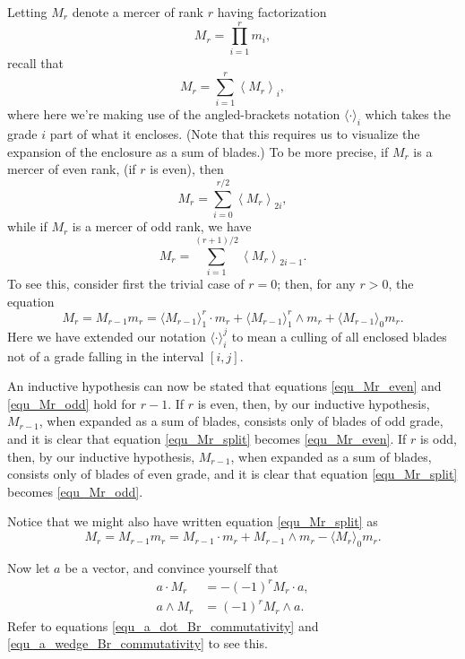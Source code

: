 \documentclass{birkjour}
\theoremstyle{definition}
\theoremstyle{remark}
\numberwithin{equation}{section}
\begin{document}
Letting $M_r$ denote a mercer of rank $r$ having factorization
\begin{equation}\label{equ_M_r}
M_r = \prod_{i=1}^r m_i,
\end{equation}
recall that
\begin{equation*}
M_r = \sum_{i=1}^r\left\langle M_r\right\rangle_i,
\end{equation*}
where here we're making use of the angled-brackets notation $\langle\cdot\rangle_i$ which takes the grade $i$ part of
what it encloses.  (Note that this requires us to visualize the expansion of the enclosure as a sum of blades.)  To be more precise,
if $M_r$ is a mercer of even rank, (if $r$ is even), then
\begin{equation}\label{equ_Mr_even}
M_r = \sum_{i=0}^{r/2}\left\langle M_r\right\rangle_{2i},
\end{equation}
while if $M_r$ is a mercer of odd rank, we have
\begin{equation}\label{equ_Mr_odd}
M_r = \sum_{i=1}^{(r+1)/2}\left\langle M_r\right\rangle_{2i-1}.
\end{equation}
To see this, consider first the trivial case of $r=0$; then, for any $r>0$, the equation
\begin{equation}\label{equ_Mr_split}
M_r = M_{r-1}m_r = \langle M_{r-1}\rangle_1^r\cdot m_r + \langle M_{r-1}\rangle_1^r\wedge m_r + \langle M_{r-1}\rangle_0 m_r.
\end{equation}
Here we have extended our notation $\langle\cdot\rangle_i^j$ to mean a culling of all enclosed blades not of a grade falling
in the interval $[i,j]$.

An inductive hypothesis can now be stated that equations \eqref{equ_Mr_even} and \eqref{equ_Mr_odd} hold for $r-1$.
If $r$ is even, then, by our inductive hypothesis, $M_{r-1}$, when expanded as a sum of blades, consists only of blades of odd grade,
and it is clear that equation \eqref{equ_Mr_split} becomes \eqref{equ_Mr_even}.  If $r$ is odd, then, by our inductive hypothesis, $M_{r-1}$, when expanded as
a sum of blades, consists only of blades of even grade, and it is clear that equation \eqref{equ_Mr_split} becomes \eqref{equ_Mr_odd}.

Notice that we might also have written equation \eqref{equ_Mr_split} as
\begin{equation*}
M_r = M_{r-1}m_r = M_{r-1}\cdot m_r + M_{r-1}\wedge m_r - \langle M_r\rangle_0 m_r.
\end{equation*}

Now let $a$ be a vector, and convince yourself that
\begin{align}
a\cdot M_r &= -(-1)^r M_r\cdot a,\label{equ_a_dot_Mr_commutativity} \\
a\wedge M_r &= (-1)^r M_r\wedge a.\label{equ_a_wedge_Mr_commutativity}
\end{align}
Refer to equations \eqref{equ_a_dot_Br_commutativity} and \eqref{equ_a_wedge_Br_commutativity} to see this.
\end{document}
